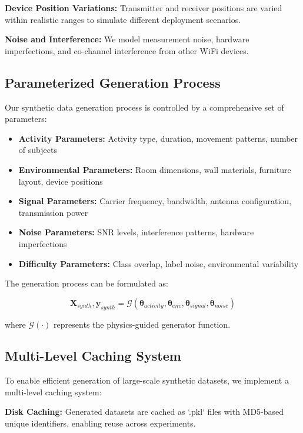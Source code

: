 \documentclass[journal]{IEEEtran}
\begin{document}
\textbf{Device Position Variations:} Transmitter and receiver positions are varied within realistic ranges to simulate different deployment scenarios.

\textbf{Noise and Interference:} We model measurement noise, hardware imperfections, and co-channel interference from other WiFi devices.

\subsection{Parameterized Generation Process}

Our synthetic data generation process is controlled by a comprehensive set of parameters:

\begin{itemize}
\item \textbf{Activity Parameters:} Activity type, duration, movement patterns, number of subjects
\item \textbf{Environmental Parameters:} Room dimensions, wall materials, furniture layout, device positions
\item \textbf{Signal Parameters:} Carrier frequency, bandwidth, antenna configuration, transmission power
\item \textbf{Noise Parameters:} SNR levels, interference patterns, hardware imperfections
\item \textbf{Difficulty Parameters:} Class overlap, label noise, environmental variability
\end{itemize}

The generation process can be formulated as:

\begin{equation}
\mathbf{X}_{synth}, \mathbf{y}_{synth} = \mathcal{G}(\boldsymbol{\theta}_{activity}, \boldsymbol{\theta}_{env}, \boldsymbol{\theta}_{signal}, \boldsymbol{\theta}_{noise})
\end{equation}

where $\mathcal{G}(\cdot)$ represents the physics-guided generator function.

\subsection{Multi-Level Caching System}

To enable efficient generation of large-scale synthetic datasets, we implement a multi-level caching system:

\textbf{Disk Caching:} Generated datasets are cached as `.pkl` files with MD5-based unique identifiers, enabling reuse across experiments.
\end{document}
